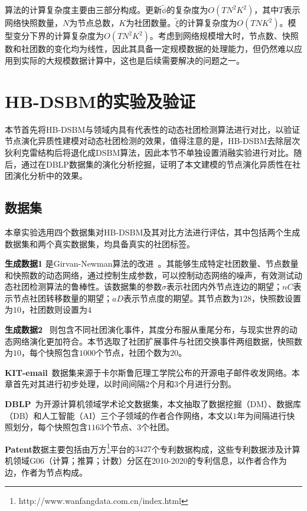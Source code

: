 算法的计算复杂度主要由三部分构成。更新$\widetilde{\phi}$的复杂度为$O(TN^2K^2)$，其中$T$表示网络快照数量，$N$为节点总数，$K$为社团数量。$\widetilde{\xi}$的计算复杂度为$O(TNK^2)$。模型变分下界的计算复杂度为$O(TN^2K^2)$。考虑到网络规模增大时，节点数、快照数和社团数的变化均为线性，因此其具备一定规模数据的处理能力，但仍然难以应用到实际的大规模数据计算中，这也是后续需要解决的问题之一。

\section{HB-DSBM的实验及验证}


本节首先将HB-DSBM与领域内具有代表性的动态社团检测算法进行对比，以验证节点演化异质性建模对动态社团检测的效果，值得注意的是，HB-DSBM去除层次狄利克雷结构后将退化成DSBM算法，因此本节不单独设置消融实验进行对比。随后，通过在DBLP数据集的演化分析挖掘，证明了本文建模的节点演化异质性在社团演化分析中的效果。


\subsection{数据集}

本章实验选用四个数据集对HB-DSBM及其对比方法进行评估，其中包括两个生成数据集和两个真实数据集，均具备真实的社团标签。

\textbf{生成数据1} 是Girvan-Newman算法的改进~\cite{lin2008facetnet}。其能够生成特定社团数量、节点数量和快照数的动态网络，通过控制生成参数，可以控制动态网络的噪声，有效测试动态社团检测算法的鲁棒性。该数据集的参数$\sigma$表示社团内外节点连边的期望；$nC$表示节点社团转移数量的期望；$aD$表示节点度的期望。其节点数为$128$，快照数设置为$10$，社团数则设置为$4$

\textbf{生成数据2} ~\cite{greene2010tracking}则包含不同社团演化事件，其度分布服从重尾分布，与现实世界的动态网络演化更加符合。本节选取了社团扩展事件与社团交换事件两组数据，快照数为$10$，每个快照包含$1000$个节点，社团个数为$20$。

\textbf{KIT-email}~\cite{gorkedynamic}数据集来源于卡尔斯鲁厄理工学院公布的开源电子邮件收发网络。本章首先对其进行初步处理，以时间间隔$2个月$和$3个月$进行分割。

\textbf{DBLP}~\cite{konect:2017:dblp-cite}为开源计算机领域学术论文数据集，本文抽取了数据挖掘（DM）、数据库（DB）和人工智能（AI）三个子领域的作者合作网络，本文以$1$年为间隔进行快照划分，每个快照包含$1163$个节点、$3$个社团。

\textbf{Patent}数据主要包括由万方\footnote{ http://www.wanfangdata.com.cn/index.html}平台的$3427$个专利数据构成，这些专利数据涉及计算机领域G06（计算；推算；计数）分区在2010-2020的专利信息，以作者合作为边，作者为节点构成。

